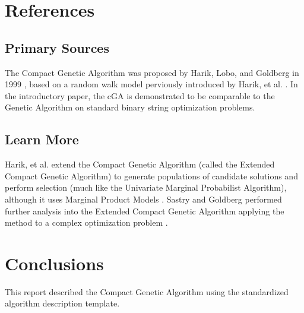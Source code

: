\documentclass[a4paper, 11pt]{article}
\begin{document}


\section{References}
\label{sec:references}

% 
% 
\subsection{Primary Sources}
The Compact Genetic Algorithm was proposed by Harik, Lobo, and Goldberg in 1999 \cite{Harik1999}, based on a random walk model perviously introduced by Harik, et al. \cite{Harik1997}. In the introductory paper, the cGA is demonstrated to be comparable to the Genetic Algorithm on standard binary string optimization problems.

% 
% 
\subsection{Learn More}
Harik, et al. extend the Compact Genetic Algorithm (called the Extended Compact Genetic Algorithm) to generate populations of candidate solutions and perform selection (much like the Univariate Marginal Probabilist Algorithm), although it uses Marginal Product Models \cite{Harik1999a, Harik2006}. Sastry and Goldberg performed further analysis into the Extended Compact Genetic Algorithm applying the method to a complex optimization problem \cite{Sastry2000}.


% 
% 
\section{Conclusions}
\label{sec:conclusions}
This report described the Compact Genetic Algorithm using the standardized algorithm description template.
\end{document}

